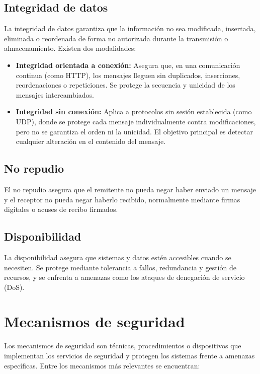 \documentclass[11pt,a4paper]{article}
\begin{document}
    \subsection{Integridad de datos}
    La integridad de datos garantiza que la información no sea modificada, insertada, eliminada o reordenada de forma no autorizada durante la transmisión o almacenamiento. Existen dos modalidades:

    \begin{itemize}
        \item \textbf{Integridad orientada a conexión:} Asegura que, en una comunicación continua (como HTTP), los mensajes lleguen sin duplicados, inserciones, reordenaciones o repeticiones. Se protege la secuencia y unicidad de los mensajes intercambiados.
        \item \textbf{Integridad sin conexión:} Aplica a protocolos sin sesión establecida (como UDP), donde se protege cada mensaje individualmente contra modificaciones, pero no se garantiza el orden ni la unicidad. El objetivo principal es detectar cualquier alteración en el contenido del mensaje.
    \end{itemize}

    \subsection{No repudio}
    El no repudio asegura que el remitente no pueda negar haber enviado un mensaje y el receptor no pueda negar haberlo recibido, normalmente mediante firmas digitales o acuses de recibo firmados.

    \subsection{Disponibilidad}
    La disponibilidad asegura que sistemas y datos estén accesibles cuando se necesiten. Se protege mediante tolerancia a fallos, redundancia y gestión de recursos, y se enfrenta a amenazas como los ataques de denegación de servicio (DoS).

    \section{Mecanismos de seguridad}

    Los mecanismos de seguridad son técnicas, procedimientos o dispositivos que implementan los servicios de seguridad y protegen los sistemas frente a amenazas específicas. Entre los mecanismos más relevantes se encuentran:
\end{document}
